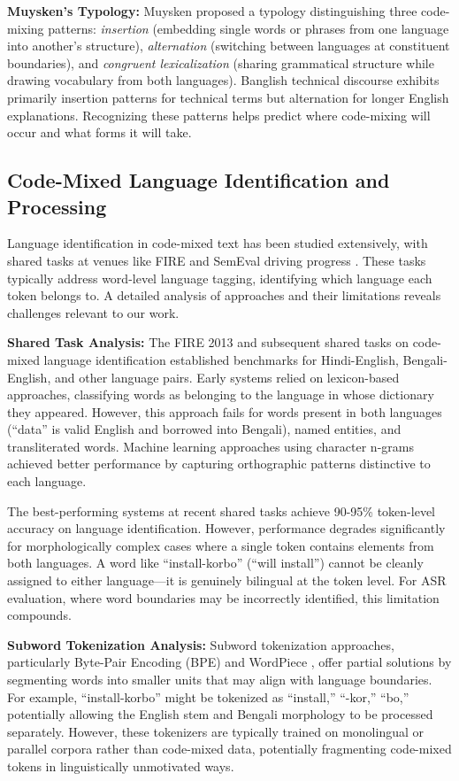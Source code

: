 \textbf{Muysken's Typology:} Muysken \cite{Muysken2000} proposed a typology distinguishing three code-mixing patterns: \textit{insertion} (embedding single words or phrases from one language into another's structure), \textit{alternation} (switching between languages at constituent boundaries), and \textit{congruent lexicalization} (sharing grammatical structure while drawing vocabulary from both languages). Banglish technical discourse exhibits primarily insertion patterns for technical terms but alternation for longer English explanations. Recognizing these patterns helps predict where code-mixing will occur and what forms it will take.

\subsection{Code-Mixed Language Identification and Processing}

Language identification in code-mixed text has been studied extensively, with shared tasks at venues like FIRE and SemEval driving progress \cite{Solorio2014, Aguilar2018}. These tasks typically address word-level language tagging, identifying which language each token belongs to. A detailed analysis of approaches and their limitations reveals challenges relevant to our work.

\textbf{Shared Task Analysis:} The FIRE 2013 and subsequent shared tasks on code-mixed language identification established benchmarks for Hindi-English, Bengali-English, and other language pairs. Early systems relied on lexicon-based approaches, classifying words as belonging to the language in whose dictionary they appeared. However, this approach fails for words present in both languages (``data'' is valid English and borrowed into Bengali), named entities, and transliterated words. Machine learning approaches using character n-grams achieved better performance by capturing orthographic patterns distinctive to each language.

The best-performing systems at recent shared tasks achieve 90-95\% token-level accuracy on language identification. However, performance degrades significantly for morphologically complex cases where a single token contains elements from both languages. A word like ``install-korbo'' (``will install'') cannot be cleanly assigned to either language---it is genuinely bilingual at the token level. For ASR evaluation, where word boundaries may be incorrectly identified, this limitation compounds.

\textbf{Subword Tokenization Analysis:} Subword tokenization approaches, particularly Byte-Pair Encoding (BPE) \cite{Sennrich2016} and WordPiece \cite{Schuster2012}, offer partial solutions by segmenting words into smaller units that may align with language boundaries. For example, ``install-korbo'' might be tokenized as ``install,'' ``-kor,'' ``bo,'' potentially allowing the English stem and Bengali morphology to be processed separately. However, these tokenizers are typically trained on monolingual or parallel corpora rather than code-mixed data, potentially fragmenting code-mixed tokens in linguistically unmotivated ways.

